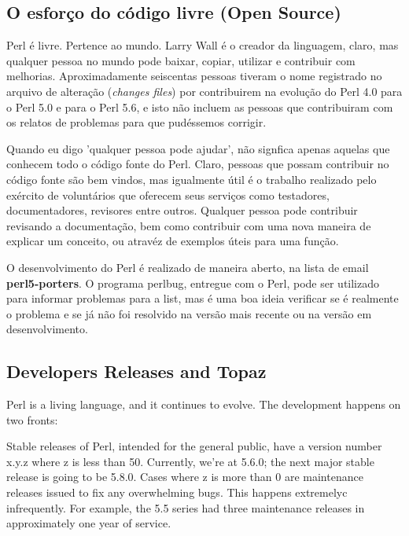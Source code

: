 \documentclass[a4paper,11pt]{book}
\begin{document}
\subsection{O esfor\c{c}o do código livre (Open Source)}

\noindent Perl é livre. Pertence ao mundo. Larry Wall é o creador da linguagem, claro, mas qualquer pessoa no mundo pode baixar, copiar, utilizar e contribuir com melhorias. Aproximadamente seiscentas pessoas tiveram o nome registrado no arquivo de alteração (\textit{changes files}) por contribuirem na evolução do Perl 4.0 para o Perl 5.0 e para o Perl 5.6, e isto não incluem as pessoas que contribuiram com os relatos de problemas para que pudéssemos  corrigir.

\noindent Quando eu digo 'qualquer pessoa pode ajudar', não signfica apenas aquelas que conhecem todo o código fonte do Perl. Claro, pessoas que possam contribuir no código fonte são bem vindos, mas igualmente útil é o trabalho realizado pelo exército de voluntários que oferecem seus serviços como testadores, documentadores, revisores entre outros. Qualquer pessoa pode contribuir revisando a documenta\c{c}ão, bem como contribuir com uma nova maneira de explicar um conceito, ou atravéz de exemplos úteis para uma fun\c{c}ão.

\noindent O desenvolvimento do Perl é realizado de maneira aberto, na lista de email \textbf{perl5-porters}. O programa perlbug, entregue com o Perl, pode ser utilizado para informar problemas para a list, mas é uma boa ideia verificar se é realmente o problema e se já não foi resolvido na versão mais recente ou na versão em desenvolvimento.

\subsection{Developers Releases and Topaz}

\noindent Perl is a living language, and it continues to evolve. The development happens on two fronts:

\noindent 

\noindent Stable releases of Perl, intended for the general public, have a version number x.y.z  where  z  is less than 50. Currently, we're at 5.6.0; the next major stable release is going to be 5.8.0. Cases where z is more than 0 are maintenance releases issued to fix any overwhelming bugs. This happens extremelyc infrequently. For example, the 5.5 series had three maintenance releases in approximately one year of service.
\end{document}
